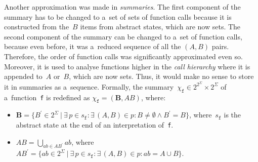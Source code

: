 Another approximation was made in \emph{summaries}. The first component
of the summary has to be changed to a~set of sets of function calls
because it is constructed from the~$ B $ items from abstract states,
which are now sets. The second component of the summary can be changed
to a~set of function calls, because even before, it was a~reduced
sequence of all the ${ (A, B) }$ pairs. Therefore, the order of function calls
was significantly approximated even so. Moreover, it is used to analyse
functions higher in the \emph{call hierarchy} where it is appended to~$ A $
or~$ B $, which are now sets. Thus, it would make no sense to store it in 
summaries as a~sequence. Formally, the summary~$ \chi_\mathtt{f} \in
2^{2^\Sigma} \times 2^\Sigma $ of a~function~\texttt{f} is redefined as
$ \chi_\mathtt{f} = (\boldsymbol{B}, AB) $, where:
\begin{itemize}
    \item 
        $ \boldsymbol{B} = \{B^\prime \in 2^\Sigma\ |\ \exists\,p \in
        s_\mathtt{f} : \exists\,{(A, B)} \in p : B \neq \emptyset \wedge
        B^\prime = B\} $, where~$ s_\mathtt{f} $ is the abstract state at
        the end of an interpretation of~\texttt{f}.
        
    \item
        $ AB = \bigcup\limits_{ab \in AB^\prime} ab $,
        where $ AB^\prime = \{ab \in 2^\Sigma\ |\ \exists\,p \in
        s_\mathtt{f} : \exists\,(A, B) \in p: ab = {A \cup B}\} $.
\end{itemize}

